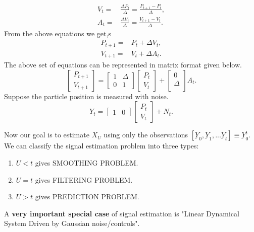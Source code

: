 \documentclass[a4paper,english,12pt]{article}
\begin{document}
\begin{align}
    V_t=&\frac{\Delta P_t}{\Delta}=\frac{P_{t+1}-P_t}{\Delta},\\
    A_t=&\frac{\Delta V_t}{\Delta}=\frac{V_{t+1}-V_t}{\Delta}.
\end{align}
From the above equations we get,s
\begin{align}
    P_{t+1}=&P_t+\Delta V_t,\\
    V_{t+1}=&V_t+\Delta A_t.
\end{align}
The above set of equations can be represented in matrix format given below.
\begin{equation}
\begin{bmatrix}
P_{t+1}\\
V_{t+1}
\end{bmatrix}
=
\begin{bmatrix}
1    &\Delta\\
0    &1
\end{bmatrix}
\begin{bmatrix}
P_t\\
V_t
\end{bmatrix}
+
\begin{bmatrix}
0\\
\Delta\\
\end{bmatrix}
A_t.
\end{equation}
Suppose the particle position  is measured with noise.
\begin{equation}
    Y_t=
    \begin{bmatrix}
    1   &0
    \end{bmatrix}
    \begin{bmatrix}
    P_t\\
    V_t
    \end{bmatrix}
    + N_t.
\end{equation}
\par Now our goal is to estimate $X_U$ using only the observations $[\underbar{Y}_0,\underbar{Y}_1,...\underbar{Y}_t]\equiv \underbar{Y}_0^t $.
We can classify the signal estimation problem into three types:
\begin{enumerate}
  \item $U<t$ gives SMOOTHING PROBLEM.
  \item $U=t$ gives FILTERING PROBLEM.
  \item $U>t$ gives PREDICTION PROBLEM.
\end{enumerate}
\par A \textbf{very important special case} of signal estimation is "Linear Dynamical System Driven by Gaussian noise/controls".
\end{document}
